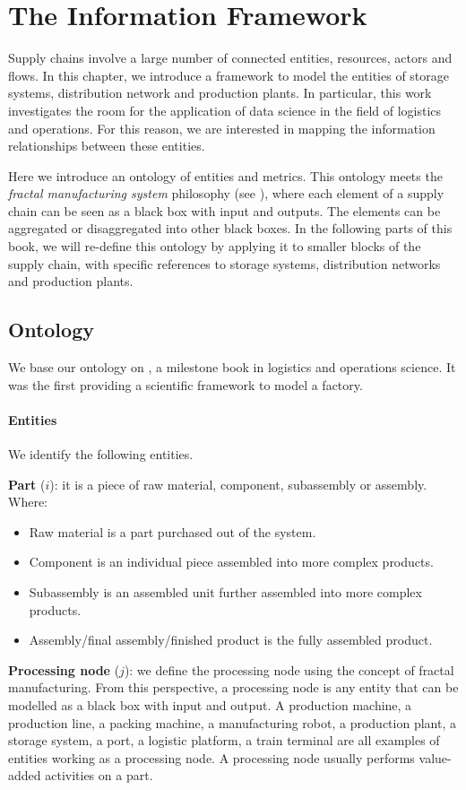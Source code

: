 \chapter{The Information Framework} \label{chap_InformationFramework}


Supply chains involve a large number of connected entities, resources, actors and flows.  In this chapter, we introduce a framework to model the entities of storage systems, distribution network and production plants. In particular, this work investigates the room for the application of data science in the field of logistics and operations. For this reason, we are interested in mapping the information relationships between these entities.\par

Here we introduce an ontology of entities and metrics. This ontology meets the \textit{fractal manufacturing system} philosophy (see \cite{Sprock2018}), where each element of a supply chain can be seen as a black box with input and outputs. The elements can be aggregated or disaggregated into other black boxes. In the following parts of this book, we will re-define this ontology by applying it to smaller blocks of the supply chain, with specific references to storage systems, distribution networks and production plants.

\section{Ontology}\label{secOntology}
We base our ontology on \cite{Hopp2011}, a milestone book in logistics and operations science. It was the first providing a scientific framework to model a factory. 

\subsubsection{Entities}
We identify the following entities.\par
\textbf{Part} ($i$): it is a piece of raw material, component, subassembly or assembly. Where:
\begin{itemize}
    \item Raw material is a part purchased out of the system.
    \item Component is an individual piece assembled into more complex products.
    \item Subassembly is an assembled unit further assembled into more complex products.
    \item Assembly/final assembly/finished product is the fully assembled product.
\end{itemize}
\par
\textbf{Processing node} ($j$): we define the processing node using the concept of fractal manufacturing. From this perspective, a processing node is any entity that can be modelled as a black box with input and output. A production machine, a production line, a packing machine, a manufacturing robot, a production plant, a storage system, a port, a logistic platform, a train terminal are all examples of entities working as a processing node. A processing node usually performs value-added activities on a part. \par

